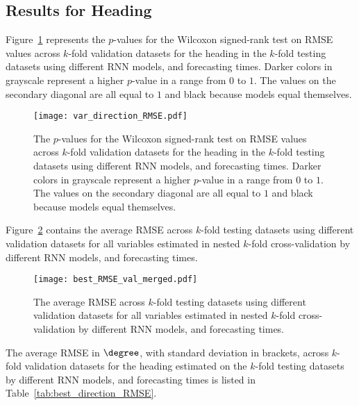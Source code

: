 \subsection{Results for Heading}

Figure~\ref{fig:var_direction_RMSE} represents the $p$-values for the Wilcoxon signed-rank test on RMSE values across $k$-fold validation datasets for the heading in the $k$-fold testing datasets using different RNN models, and forecasting times. Darker colors in grayscale represent a higher $p$-value in a range from $0$ to $1$. The values on the secondary diagonal are all equal to $1$ and black because models equal themselves.

\begin{figure}[!ht]
	\centering
	\texttt{[image: var\_direction\_RMSE.pdf]}
	\caption{The $p$-values for the Wilcoxon signed-rank test on RMSE values across $k$-fold validation datasets for the heading in the $k$-fold testing datasets using different RNN models, and forecasting times. Darker colors in grayscale represent a higher $p$-value in a range from $0$ to $1$. The values on the secondary diagonal are all equal to $1$ and black because models equal themselves.}
	\label{fig:var_direction_RMSE}
\end{figure}

Figure~\ref{fig:best_RMSE_val_merged} contains the average RMSE across $k$-fold testing datasets using different validation datasets for all variables estimated in nested $k$-fold cross-validation by different RNN models, and forecasting times.

\begin{figure}[!ht]
	\centering
	\texttt{[image: best\_RMSE\_val\_merged.pdf]}
	\caption{The average RMSE across $k$-fold testing datasets using different validation datasets for all variables estimated in nested $k$-fold cross-validation by different RNN models, and forecasting times.}
	\label{fig:best_RMSE_val_merged}
\end{figure}

The average RMSE in $\degree$, with standard deviation in brackets, across $k$-fold validation datasets for the heading estimated on the $k$-fold testing datasets by different RNN models, and forecasting times is listed in Table~\ref{tab:best_direction_RMSE}.

